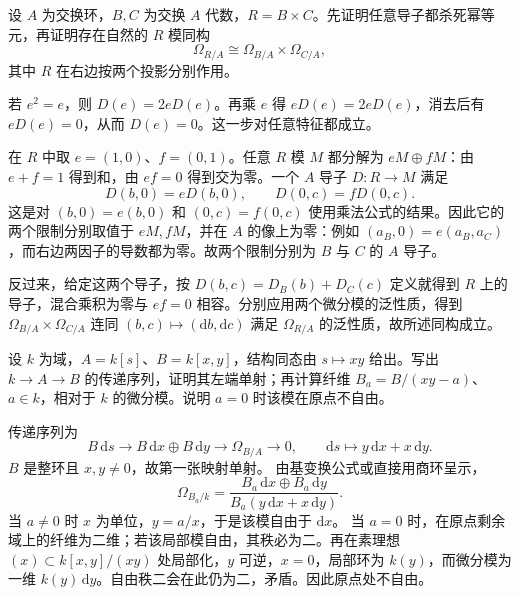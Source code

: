 \begin{exercise}\label{g5:ex:product-differentials}
	设 \(A\) 为交换环，\(B,C\) 为交换 \(A\) 代数，\(R=B\times C\)。先证明任意导子都杀死幂等元，再证明存在自然的 \(R\) 模同构
	\[
		\Omega_{R/A}\cong\Omega_{B/A}\times\Omega_{C/A},
	\]
	其中 \(R\) 在右边按两个投影分别作用。
\end{exercise}
\begin{solution}
	若 \(e^2=e\)，则 \(D(e)=2eD(e)\)。再乘 \(e\) 得 \(eD(e)=2eD(e)\)，消去后有 \(eD(e)=0\)，从而 \(D(e)=0\)。这一步对任意特征都成立。

	在 \(R\) 中取 \(e=(1,0)\)、\(f=(0,1)\)。任意 \(R\) 模 \(M\) 都分解为 \(eM\oplus fM\)：由 \(e+f=1\) 得到和，由 \(ef=0\) 得到交为零。一个 \(A\) 导子 \(D:R\to M\) 满足
	\[
		D(b,0)=eD(b,0),\qquad D(0,c)=fD(0,c).
	\]
	这是对 \((b,0)=e(b,0)\) 和 \((0,c)=f(0,c)\) 使用乘法公式的结果。因此它的两个限制分别取值于 \(eM,fM\)，并在 \(A\) 的像上为零：例如 \((a_B,0)=e(a_B,a_C)\)，而右边两因子的导数都为零。故两个限制分别为 \(B\) 与 \(C\) 的 \(A\) 导子。

	反过来，给定这两个导子，按 \(D(b,c)=D_B(b)+D_C(c)\) 定义就得到 \(R\) 上的导子，混合乘积为零与 \(ef=0\) 相容。分别应用两个微分模的泛性质，得到
	\(\Omega_{B/A}\times\Omega_{C/A}\) 连同 \((b,c)\mapsto(\mathrm{d}b,\mathrm{d}c)\) 满足 \(\Omega_{R/A}\) 的泛性质，故所述同构成立。
\end{solution}

\begin{exercise}\label{g5:ex:node-family-differentials}
	设 \(k\) 为域，\(A=k[s]\)、\(B=k[x,y]\)，结构同态由 \(s\mapsto xy\) 给出。写出 \(k\to A\to B\) 的传递序列，证明其左端单射；再计算纤维 \(B_a=B/(xy-a)\)、\(a\in k\)，相对于 \(k\) 的微分模。说明 \(a=0\) 时该模在原点不自由。
\end{exercise}
\begin{solution}
	传递序列为
	\[
		B\,\mathrm{d}s\longrightarrow
		B\,\mathrm{d}x\oplus B\,\mathrm{d}y
		\longrightarrow\Omega_{B/A}\longrightarrow0,
		\qquad \mathrm{d}s\longmapsto y\,\mathrm{d}x+x\,\mathrm{d}y.
	\]
	\(B\) 是整环且 \(x,y\ne0\)，故第一张映射单射。
	由基变换公式或直接用商环呈示，
	\[
		\Omega_{B_a/k}
		=\frac{B_a\,\mathrm{d}x\oplus B_a\,\mathrm{d}y}
		{B_a(y\,\mathrm{d}x+x\,\mathrm{d}y)}.
	\]
	当 \(a\ne0\) 时 \(x\) 为单位，\(y=a/x\)，于是该模自由于 \(\mathrm{d}x\)。
	当 \(a=0\) 时，在原点剩余域上的纤维为二维；若该局部模自由，其秩必为二。再在素理想 \((x)\subset k[x,y]/(xy)\) 处局部化，\(y\) 可逆，\(x=0\)，局部环为 \(k(y)\)，而微分模为一维 \(k(y)\,\mathrm{d}y\)。自由秩二会在此仍为二，矛盾。因此原点处不自由。
\end{solution}

